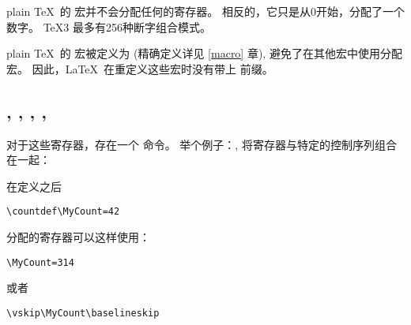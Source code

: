 \documentclass{book}
\begin{document}
plain \TeX\ 的  宏并不会分配任何的寄存器。
相反的，它只是从0开始，分配了一个数字。
\TeX3 最多有256种断字组合模式。

plain \TeX\ 的  宏被定义为 
(精确定义详见 \ref{macro} 章),
 避免了在其他宏中使用分配宏。
因此，\LaTeX\ 在重定义这些宏时没有带上  前缀。

\subsection{, , , , }

对于这些寄存器，存在一个  命令。
举个例子：, 将寄存器与特定的控制序列组合在一起：
\begin{Disp}\end{Disp}

在定义之后
\begin{verbatim}
\countdef\MyCount=42
\end{verbatim}
分配的寄存器可以这样使用：
\begin{verbatim}
\MyCount=314
\end{verbatim}
或者
\begin{verbatim}
\vskip\MyCount\baselineskip
\end{verbatim}
\end{document}
